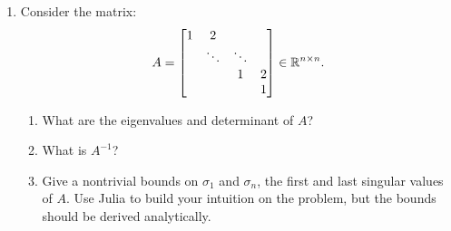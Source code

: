 \documentclass[11pt,letterpaper]{article}
\begin{document}
\begin{enumerate}
\item Consider the matrix:
\[
A = \begin{bmatrix} 1 & 2\\ & \ddots & \ddots\\ & & 1 & 2\\ & & & 1\end{bmatrix} \in \mathbb{R}^{n\times n}.
\]
\begin{enumerate}
\item What are the eigenvalues and determinant of $A$?
\item What is $A^{-1}$?
\item Give a nontrivial bounds on $\sigma_1$ and $\sigma_n$, the first and last singular values of $A$. Use {\sc Julia} to build your intuition on the problem, but the bounds should be derived analytically.
\end{enumerate}

\end{enumerate}
\end{document}
